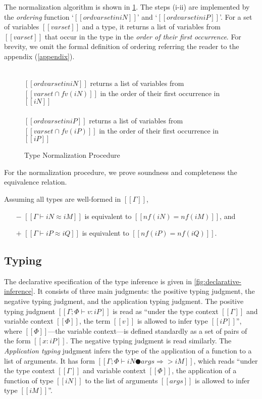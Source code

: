 The normalization algorithm is shown in \cref{fig:type-nf}. The steps (i-ii) are
implemented by the \emph{ordering} function `$[[ord varset in iN]]$' and `$[[ord
varset in iP]]$'. For a set of variables $[[varset]]$ and a type, it returns a
list of variables from $[[varset]]$ that occur in the type in the \emph{order of
their first occurrence}. For brevity, we omit the formal definition of ordering
referring the reader to the appendix (\cref{appendix}).

\begin{figure}[h]
  
  \begin{multicols}{2}
  \ottdefnNrmNNormLabeled{}
  \\
  $[[ord varset in iN]]$ returns a list of variables from 
  $[[varset ∩ fv(iN)]]$ in the order of their first occurrence in $[[iN]]$
  \columnbreak\\
  \ottdefnNrmPNormLabeled{}
  \\
  $[[ord varset in iP]]$ returns a list of variables from 
  $[[varset ∩ fv(iP)]]$ in the order of their first occurrence in $[[iP]]$
  \end{multicols}


  \caption{Type Normalization Procedure} 
  \label{fig:type-nf}
\end{figure}


For the normalization procedure, 
we prove soundness and completeness \wrt the equivalence relation.
\begin{property}
  Assuming all types are well-formed in $[[Γ]]$,
  \begin{itemize}
    \item[$-$] $[[Γ ⊢ iN ≈ iM]]$ is equivalent to $[[nf(iN) = nf(iM)]]$, and
    \item[$+$] $[[Γ ⊢ iP ≈ iQ]]$ is equivalent to $[[nf(iP) = nf(iQ)]]$.
  \end{itemize}
\end{property}


\subsection{Typing}

The declarative specification of the type inference is given in 
\cref{fig:declarative-inference}.
It consists of three main judgments: the positive typing judgment,
the negative typing judgment, and the application typing judgment.
The positive typing judgment $[[Γ ; Φ ⊢ v : iP]]$ is read as 
``under the type context $[[Γ]]$ and variable context $[[Φ]]$,
the term $[[v]]$ is allowed to infer type $[[iP]]$'',
where $[[Φ]]$---the variable context---is defined standardly as
a set of pairs of the form $[[x : iP]]$. 
The negative typing judgment is read similarly.
The \emph{Application typing} judgment
infers the type of the application of a function to a list of arguments.
It has form $[[Γ ; Φ ⊢ iN ● args ⇒> iM]]$, 
which reads ``under the type context $[[Γ]]$ and variable context $[[Φ]]$,
the application of a function of type $[[iN]]$ to the list of arguments $[[args]]$
is allowed to infer type $[[iM]]$''.

